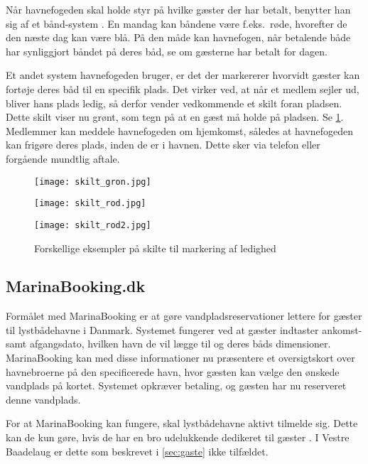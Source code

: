 Når havnefogeden skal holde styr på hvilke gæster der har betalt, benytter han sig af et bånd-system \cite{int_hf}. En mandag kan båndene være f.eks.\ røde, hvorefter de den næste dag kan være blå. På den måde kan havnefogen, når betalende både har synliggjort båndet på deres båd, se om gæsterne har betalt for dagen.

Et andet system havnefogeden bruger, er det der markererer hvorvidt gæster kan fortøje deres båd til en specifik plads. Det virker ved, at når et medlem sejler ud, bliver hans plads ledig, så derfor vender vedkommende et skilt foran pladsen. Dette skilt viser nu grønt, som tegn på at en gæst må holde på pladsen. Se \cref{fig:skilte}. Medlemmer kan meddele havnefogeden om hjemkomst, således at havnefogeden kan frigøre deres plads, inden de er i havnen. Dette sker via telefon eller forgående mundtlig aftale.

\begin{figure}[h]
  \centering
  \begin{minipage}{0.30\textwidth}
    \texttt{[image: skilt\_gron.jpg]}
  \end{minipage}
  \begin{minipage}{0.30\textwidth}
    \texttt{[image: skilt\_rod.jpg]}
  \end{minipage}
  \begin{minipage}{0.30\textwidth}
    \texttt{[image: skilt\_rod2.jpg]}
  \end{minipage}
  \caption{Forskellige eksempler på skilte til markering af ledighed}
  \label{fig:skilte}
\end{figure}

\subsection{MarinaBooking.dk} %
\label{sub:MarinaBooking.dk}

Formålet med MarinaBooking \cite{marinabooking} er at gøre vandpladsreservationer lettere for gæster til lystbådehavne i Danmark. Systemet fungerer ved at gæster indtaster ankomst- samt afgangsdato, hvilken havn de vil lægge til og deres båds dimensioner. MarinaBooking kan med disse informationer nu præsentere et oversigtskort over havnebroerne på den specificerede havn, hvor gæsten kan vælge den ønskede vandplads på kortet. Systemet opkræver betaling, og gæsten har nu reserveret denne vandplads.

For at MarinaBooking kan fungere, skal lystbådehavne aktivt tilmelde sig. Dette kan de kun gøre, hvis de har en bro udelukkende dedikeret til gæster \cite{int_vb_sl}. I Vestre Baadelaug er dette som beskrevet i \cref{sec:gaste} ikke tilfældet.

